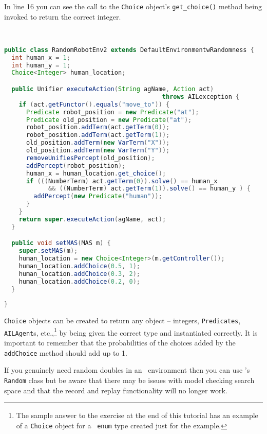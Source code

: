 In line 16 you can see the call to the \texttt{Choice} object's \texttt{get\_choice()} method being invoked to return the correct integer.
\begin{ourexample}
\label{code:RandomRobotEnv2} \quad \\
\begin{lstlisting}[basicstyle=\sffamily,language=Java,style=easslisting]
public class RandomRobotEnv2 extends DefaultEnvironmentwRandomness {
  int human_x = 1;
  int human_y = 1;
  Choice<Integer> human_location;

  public Unifier executeAction(String agName, Action act) 
                                           throws AILexception {
    if (act.getFunctor().equals("move_to")) {
      Predicate robot_position = new Predicate("at");
      Predicate old_position = new Predicate("at");
      robot_position.addTerm(act.getTerm(0));
      robot_position.addTerm(act.getTerm(1));
      old_position.addTerm(new VarTerm("X"));
      old_position.addTerm(new VarTerm("Y"));
      removeUnifiesPercept(old_position);
      addPercept(robot_position);
      human_x = human_location.get_choice();
      if (((NumberTerm) act.getTerm(0)).solve() == human_x 
            && ((NumberTerm) act.getTerm(1)).solve() == human_y ) {
        addPercept(new Predicate("human"));
      }
    }
    return super.executeAction(agName, act);
  }

  public void setMAS(MAS m) {
    super.setMAS(m);
    human_location = new Choice<Integer>(m.getController());
    human_location.addChoice(0.5, 1);
    human_location.addChoice(0.3, 2);
    human_location.addChoice(0.2, 0);
  }
	      
}
\end{lstlisting}
\end{ourexample}

\texttt{Choice} objects can be created to return any object -- integers, \texttt{Predicates}, \texttt{AILAgent}s, etc.,\footnote{The sample answer to the exercise at the end of this tutorial has an example of a \texttt{Choice} object for a \java\ \texttt{enum} type created just for the example.} by being given the correct type and instantiated correctly.  It is important to remember that the probabilities of the choices added by the \texttt{addChoice} method should add up to 1.

If you genuinely need random doubles in an \ail\ environment then you can use \java's \texttt{Random} class but be aware that there may be issues with model checking search space and that the record and replay functionality will no longer work.


